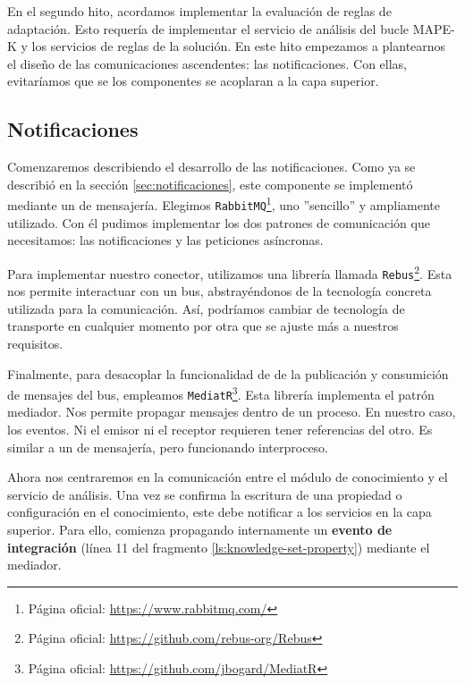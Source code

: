 En el segundo hito, acordamos implementar la evaluación de reglas de adaptación. Esto requería de implementar el servicio de análisis del bucle MAPE-K y los servicios de reglas de la solución. En este hito empezamos a plantearnos el diseño de las comunicaciones ascendentes: las notificaciones. Con ellas, evitaríamos que se los componentes se acoplaran a la capa superior.

\subsection{Notificaciones}

Comenzaremos describiendo el desarrollo de las notificaciones. Como ya se describió en la sección \ref{sec:notificaciones}, este componente se implementó mediante un  de mensajería. Elegimos \texttt{RabbitMQ}\footnote{Página oficial: \url{https://www.rabbitmq.com/}}, uno ''sencillo'' y ampliamente utilizado. \cite{newmanBuildingMicroservicesDesigning2021} Con él pudimos  implementar los dos patrones de comunicación que necesitamos: las notificaciones y las peticiones asíncronas.

Para implementar nuestro conector, utilizamos una librería llamada \texttt{Rebus}\footnote{Página oficial: \url{https://github.com/rebus-org/Rebus}}. Esta nos permite interactuar con un bus, abstrayéndonos de la tecnología concreta utilizada para la comunicación. Así, podríamos cambiar de tecnología de transporte en cualquier momento por otra que se ajuste más a nuestros requisitos.

Finalmente, para desacoplar la funcionalidad de de la publicación y consumición de mensajes del bus, empleamos \texttt{MediatR}\footnote{Página oficial: \url{https://github.com/jbogard/MediatR}}. Esta librería implementa el patrón mediador. Nos permite propagar mensajes dentro de un proceso. En nuestro caso, los eventos. Ni el emisor ni el receptor requieren tener referencias del otro. Es similar a un  de mensajería, pero funcionando interproceso.

Ahora nos centraremos en la comunicación entre el módulo de conocimiento y el servicio de análisis. Una vez se confirma la escritura de una propiedad o configuración en el conocimiento, este debe notificar a los servicios en la capa superior. Para ello, comienza propagando internamente un \textbf{evento de integración} (línea 11 del fragmento \ref{ls:knowledge-set-property}) mediante el mediador.


